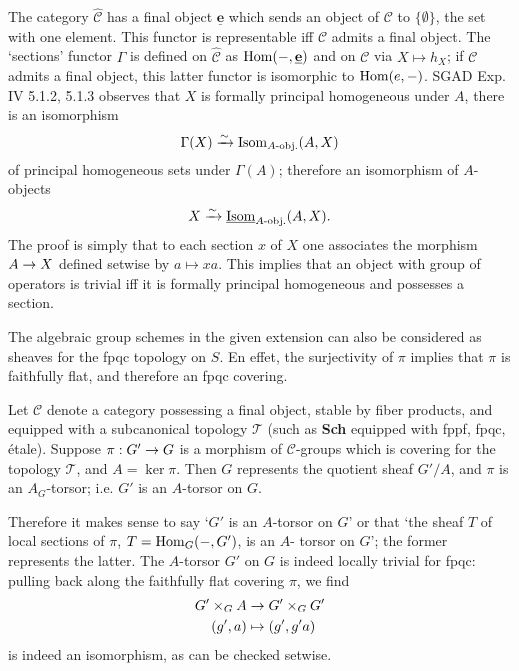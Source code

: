 \documentclass[deligne.tex]{subfiles}
\begin{document}
The category $\widehat{\mathscr C}$ has a final object
$\underline{\mathbf{e}}$ which sends an
object of $\mathscr C$ to $\{\emptyset\}$, the set with one element.
This functor is representable iff $\mathscr C$ admits a final object.
The `sections' functor $\Gamma$ is defined on $\widehat{\mathscr C}$ as
$\operatorname{Hom}(-,\underline{\mathbf{e}})$ and on $\mathscr C$ via $X\mapsto h_X$;
if $\mathscr C$ admits a final object, this latter functor is isomorphic to
$\operatorname{Hom}(e,-)$.
SGAD Exp. IV 5.1.2, 5.1.3 observes that $X$ is formally principal 
homogeneous under $A$, there is an isomorphism
\begin{equation*}
	\Gamma(X)\xrightarrow{\sim}\operatorname{Isom}_{A\text{-obj.}}(A,X)
\end{equation*}
of principal homogeneous sets under $\Gamma(A)$; therefore an isomorphism
of $A$-objects
\begin{equation*}
	X\xrightarrow{\sim}\underline{\operatorname{Isom}}_{A\text{-obj.}}(A,X).
\end{equation*}
The proof is simply that to each section $x$ of $X$ one associates the
morphism $A\rightarrow X$ defined setwise by $a\mapsto xa$.
This implies that an object with group of operators is trivial iff it is
formally principal homogeneous and possesses a section.

The algebraic group schemes in the given extension can also be
considered as sheaves for the fpqc topology on $S$. En effet, the
surjectivity of $\pi$ implies that $\pi$ is faithfully flat, and therefore
an fpqc covering.
\begin{proposition*}
Let $\mathscr C$ denote a category possessing a final object, stable
by fiber products, and equipped with a subcanonical topology $\mathcal T$
(such as \textbf{Sch} equipped with fppf, fpqc, étale).
Suppose $\pi:G'\rightarrow G$ is a morphism of $\mathscr C$-groups which is covering
for the topology $\mathcal T$, and $A=\ker\pi$.
Then $G$ represents the quotient sheaf $G'/A$, and $\pi$ is an $A_G$-torsor;
i.e. $G'$ is an $A$-torsor on $G$.
\end{proposition*}
Therefore it makes sense to say `$G'$ is an $A$-torsor on $G$' or that
`the sheaf $T$ of local sections of $\pi$, $T=\operatorname{Hom}_G(-,G')$, is an $A$-
torsor on $G$'; the former represents the latter.
The $A$-torsor $G'$ on $G$ is indeed locally trivial for fpqc: pulling back
along the faithfully flat covering $\pi$, we find
\begin{align*}
	G'\times_G A&\rightarrow G'\times_G G' \\
	(g',a)&\mapsto(g',g'a)
\end{align*}
is indeed an isomorphism, as can be checked setwise.
\end{document}
